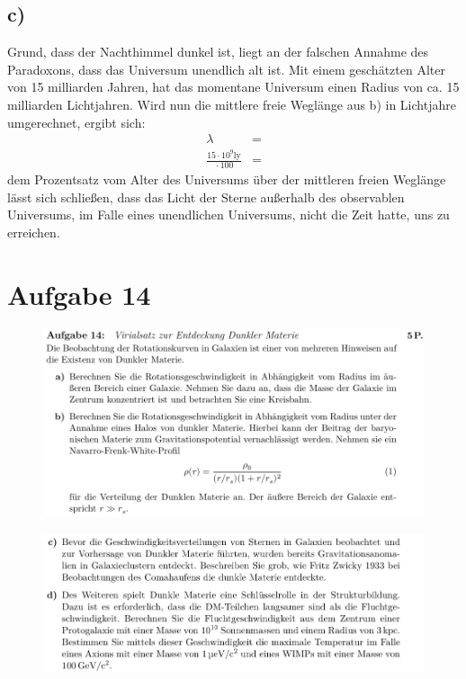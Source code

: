 \subsection{c)}

    \justifying Grund, dass der Nachthimmel dunkel ist, liegt an der falschen Annahme des Paradoxons, dass das Universum 
    unendlich alt ist. Mit einem geschätzten Alter von 15 milliarden Jahren, hat das momentane Universum einen Radius von ca. 15 milliarden
    Lichtjahren. Wird nun die mittlere freie Weglänge aus b) in Lichtjahre umgerechnet, ergibt sich:
    \begin{align*}
        \lambda &= \text{}\\
        \frac{15\cdot 10^9\text{ly}}{\text{}\cdot 100} &= \text{}
    \end{align*}
    \justifying dem Prozentsatz vom Alter des Universums über der mittleren freien Weglänge lässt sich schließen,
    dass das Licht der Sterne außerhalb des observablen Universums, im Falle eines unendlichen Universums, nicht die Zeit hatte,
    uns zu erreichen. 


\section{Aufgabe 14}

    \begin{figure}[H]
        \centering
        \includegraphics[width=\textwidth]{images/Aufgabe14ab.jpg}
        \label{fig:2}
    \end{figure}

    \begin{figure}[H]
        \centering
        \includegraphics[width=\textwidth]{images/Aufgabe14cd.jpg}
        \label{fig:3}
    \end{figure}

